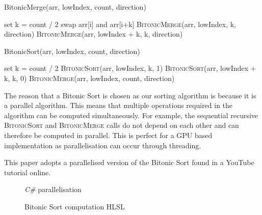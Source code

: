 \documentclass[a4paper, 12pt]{article}
\newcommand{\wideimage}[2][]{%
  \makebox[\textwidth][c]{\texttt{[image: \#2]}}%
}
\begin{document}
    \begin{algorithm}
        \caption{BitonicMerge(arr, lowIndex, count, direction)}
        \begin{algorithmic}[1]
                \State set k = count / 2
                        \State swap arr[i] and arr[i+k]
                    \EndIf
                \EndFor
                \State \textsc{BitonicMerge}(arr, lowIndex, k, direction)
                \State \textsc{BitonicMerge}(arr, lowIndex + k, k, direction)
            \EndIf
        \end{algorithmic}
    \end{algorithm}

    \begin{algorithm}
        \caption{BitonicSort(arr, lowIndex, count, direction)}
        \begin{algorithmic}[1]
                \State set k = count / 2
                \State \textsc{BitonicSort}(arr, lowIndex, k, 1)
                \State \textsc{BitonicSort}(arr, lowIndex + k, k, 0)
                \State \textsc{BitonicMerge}(arr, lowIndex, count, direction)
            \EndIf
        \end{algorithmic}
    \end{algorithm}

    The reason that a Bitonic Sort is chosen as our sorting algorithm is because it is a parallel algorithm. This means that multiple operations required in the algorithm can be computed simultaneously. For example, the sequential recursive \textsc{BitonicSort} and \textsc{BitonicMerge} calls do not depend on each other and can therefore be computed in parallel. This is perfect for a GPU based implementation as parallelisation can occur through threading.

    This paper adopts a parallelised version of the Bitonic Sort found in a YouTube tutorial online\cite{bitonicparallel}.

    \begin{figure}[H]
        \begin{center}
            \wideimage[width=\textwidth]{bitonicSortCSharp.png}
            \caption{\textit{C\#} parallelisation}
        \end{center}
    \end{figure}

    \begin{figure}[H]
        \begin{center}
            \wideimage[width=0.9\textwidth]{bitonicSortCompute.png}
            \caption{Bitonic Sort computation HLSL}
        \end{center}
    \end{figure}
\end{document}
